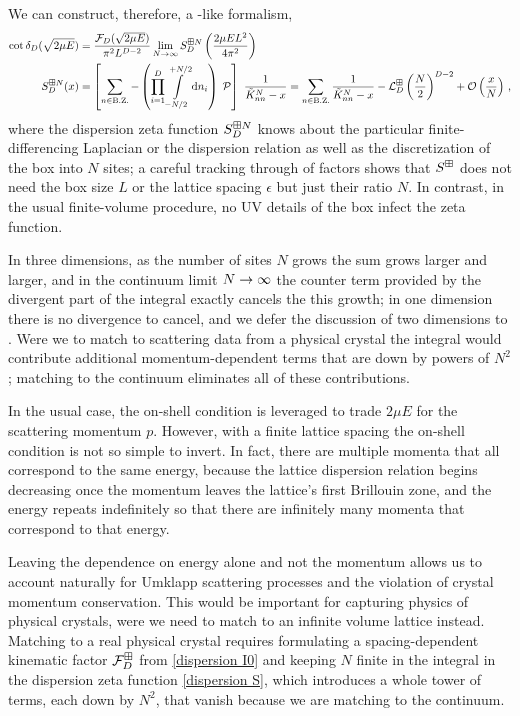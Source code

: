 We can construct, therefore, a \Luscher-like formalism,
\begin{align}
    \label{eq:dispersion quantization}
    \cot \delta_D( \sqrt{2 \mu E} )
    &=
    \frac{\mathcal{F}_D(\sqrt{2 \mu E})}{\pi^2 L^{D-2}} \lim_{N\rightarrow\infty} S^{\boxplus N}_{D}\left(\frac{2\mu E L^2}{4\pi^2}\right)
    \\
    \label{eq:dispersion S}
    S^{\boxplus N}_{D}( x )
    &=
    \left[
    	\sum_{n\in\text{B.Z.}} -
		\left(\prod_{i=1}^D
    		\int\limits_{-N/2}^{+N/2}
    		\mathrm{d} n_i
    	\right)\; \mathcal{P}
	\right]\
	\frac{1}{ \tilde K_{nn}^{N} - x} = \sum_{n\in\text{B.Z.}}\frac{1}{ \tilde K_{nn}^{N} - x} - \mathcal{L}_D^{\boxplus}\left(\frac{N}{2}\right)^{D-2}
	+ \mathcal O\left(\frac{x}{N}\right) \, ,
\end{align}
where the dispersion zeta function $S^{\boxplus N}_{D}$ knows about the particular finite-differencing Laplacian or the dispersion relation as well as the discretization of the box into $N$ sites; a careful tracking through of factors shows that $S^{\boxplus}$ does not need the box size $L$ or the lattice spacing $\epsilon$ but just their ratio $N$.
In contrast, in the usual finite-volume procedure, no UV details of the box infect the zeta function.

In three dimensions, as the number of sites $N$ grows the sum grows larger and larger, and in the continuum limit $N\rightarrow\infty$ the counter term provided by the divergent part of the integral exactly cancels the this growth; in one dimension there is no divergence to cancel, and we defer the discussion of two dimensions to .
Were we to match to scattering data from a physical crystal the integral would contribute additional momentum-dependent terms that are down by powers of $N^2$; matching to the continuum eliminates all of these contributions.

In the usual case, the on-shell condition is leveraged to trade $2\mu E$ for the scattering momentum $p$.
However, with a finite lattice spacing the on-shell condition is not so simple to invert.
In fact, there are multiple momenta that all correspond to the same energy, because the lattice dispersion relation begins decreasing once the momentum leaves the lattice's first Brillouin zone, and the energy repeats indefinitely so that there are infinitely many momenta that correspond to that energy.

Leaving the dependence on energy alone and not the momentum allows us to account naturally for Umklapp scattering processes and the violation of crystal momentum conservation.
This would be important for capturing physics of physical crystals, were we need to match to an infinite volume lattice instead.
Matching to a real physical crystal requires formulating a spacing-dependent kinematic factor $\mathcal{F}_D^\boxplus$ from \eqref{dispersion I0} and keeping $N$ finite in the integral in the dispersion zeta function \eqref{dispersion S}, which introduces a whole tower of terms, each down by $N^2$, that vanish because we are matching to the continuum.

